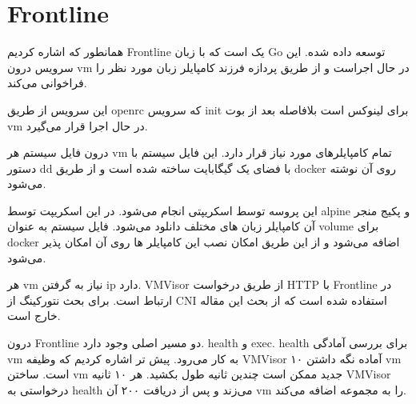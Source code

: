 \section{Frontline}

همانطور که اشاره کردیم Frontline یک  است که با زبان Go توسعه داده شده.
این سرویس درون vm در حال اجراست و از طریق پردازه فرزند کامپایلر زبان مورد نظر را فراخوانی می‌کند.

این سرویس از طریق openrc که سرویس init برای لینوکس است بلافاصله بعد از بوت vm در حال اجرا قرار می‌گیرد.

درون فایل سیستم هر vm تمام کامپایلرهای مورد نیاز قرار دارد.
این فایل سیستم با دستور dd با فضای یک گیگابایت ساخته شده است
و از طریق docker روی آن نوشته می‌شود.

این پروسه توسط اسکریپتی انجام می‌شود. در این اسکریپت توسط alpine و پکیج منجر آن کامپایلر زبان های مختلف دانلود می‌شود.
فایل سیستم به عنوان volume برای docker اضافه می‌شود و از این طریق امکان نصب این کامپایلر ها روی آن امکان پذیر می‌شود.

هر vm نیاز به گرفتن ip دارد. VMVisor از طریق درخواست HTTP با Frontline در ارتباط است.
برای بحث نتورکینگ از CNI استفاده شده است که از بحث این مقاله خارج است.

درون Frontline دو مسیر اصلی وجود دارد.
health و exec. health برای بررسی آمادگی vm به کار می‌رود.
پیش تر اشاره کردیم که وظیفه VMVisor آماده نگه داشتن ۱۰ vm است.
ساختن vm جدید ممکن است چندین ثانیه طول بکشید. هر ۱۰ ثانیه VMVisor درخواستی به health می‌زند و پس از دریافت ۲۰۰ آن vm را به مجموعه اضافه می‌کند.

